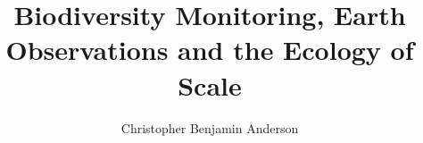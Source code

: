 \documentclass{report}
\begin{document}
\title{Biodiversity Monitoring, Earth Observations and the Ecology of Scale}
\author{Christopher Benjamin Anderson}

\beforepreface



\afterpreface







\appendix







\end{document}
